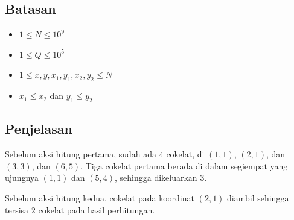 \documentclass{article}
\begin{document}
\subsection*{Batasan}

\begin{itemize}
  \item $1 \leq N \leq 10^9$
  \item $1 \leq Q \leq 10^5$
  \item $1 \leq x, y, x_1, y_1, x_2, y_2 \leq N$
  \item $x_1 \leq x_2$ dan $y_1 \leq y_2$
\end{itemize}

\subsection*{Penjelasan}

\par\noindent Sebelum aksi hitung pertama, sudah ada $4$ cokelat, di $(1,1)$, $(2,1)$, dan $(3,3)$, dan $(6,5)$. Tiga cokelat pertama berada di dalam segiempat yang ujungnya $(1,1)$ dan $(5,4)$, sehingga dikeluarkan $3$.

\par\noindent Sebelum aksi hitung kedua, cokelat pada koordinat $(2,1)$ diambil sehingga tersisa $2$ cokelat pada hasil perhitungan.
\end{document}
